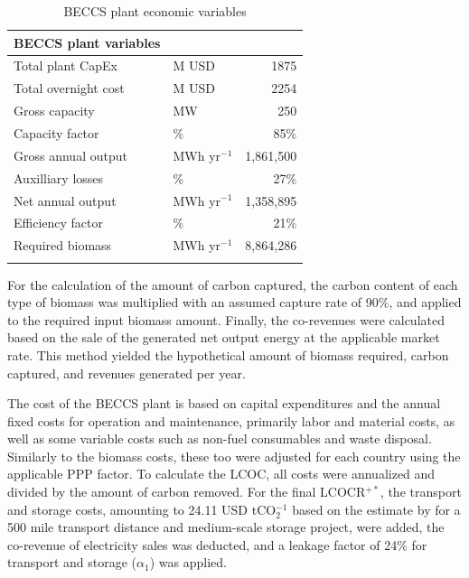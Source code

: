 \begin{table}
\small
\renewcommand{\arraystretch}{1.3}
\begin{tabular}{llr}
\hline
\textbf{BECCS plant variables} &          &                \\ \hline
Total plant CapEx  & M USD       & 1875           \\
Total overnight cost & M USD       & 2254           \\
Gross capacity & MW       & 250            \\
Capacity factor & \%        & 85\%            \\
Gross annual output & MWh yr$^{-1}$ & 1,861,500      \\
Auxilliary losses & \%        & 27\%            \\
Net annual output & MWh yr$^{-1}$ & 1,358,895      \\
Efficiency factor & \%        & 21\%            \\
Required biomass & MWh yr$^{-1}$ & 8,864,286      \\ \hline
\\
\end{tabular}
\vspace*{-\baselineskip}
\caption{BECCS plant economic variables}
\end{table}

For the calculation of the amount of carbon captured, the carbon content of each type of biomass was multiplied with an assumed capture rate of 90\%, and applied to the required input biomass amount. Finally, the co-revenues were calculated based on the sale of the generated net output energy at the applicable market rate. This method yielded the hypothetical amount of biomass required, carbon captured, and revenues generated per year.\vspace{2mm}

The cost of the BECCS plant is based on capital expenditures and the annual fixed costs for operation and maintenance, primarily labor and material costs, as well as some variable costs such as non-fuel consumables and waste disposal. Similarly to the biomass costs, these too were adjusted for each country using the applicable PPP factor. To calculate the LCOC, all costs were annualized and divided by the amount of carbon removed. For the final LCOCR$^{+*}$, the transport and storage costs, amounting to 24.11 USD tCO$_2^{-1}$ based on the estimate by \textcite{smith_cost_2021} for a 500 mile transport distance and medium-scale storage project, were added, the co-revenue of electricity sales was deducted, and a leakage factor of 24\% for transport and storage ($\alpha_1$) was applied.\vspace{2mm}

